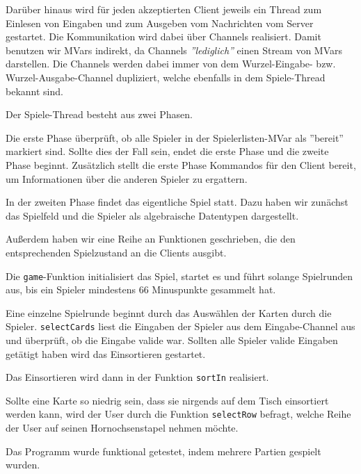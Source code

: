 \documentclass{rp}
\begin{document}
Darüber hinaus wird für jeden akzeptierten Client jeweils ein Thread zum Einlesen von Eingaben und zum Ausgeben vom Nachrichten vom Server gestartet. Die Kommunikation wird dabei über Channels realisiert. Damit benutzen wir MVars indirekt, da Channels \textit{''lediglich''} einen Stream von MVars darstellen. Die Channels werden dabei immer von dem Wurzel-Eingabe- bzw. Wurzel-Ausgabe-Channel dupliziert, welche ebenfalls in dem Spiele-Thread bekannt sind. 

Der Spiele-Thread besteht aus zwei Phasen.

Die erste Phase überprüft, ob alle Spieler in der Spielerlisten-MVar als ''bereit'' markiert sind. Sollte dies der Fall sein, endet die erste Phase und die zweite Phase beginnt. Zusätzlich stellt die erste Phase Kommandos für den Client bereit, um Informationen über die anderen Spieler zu ergattern. 

In der zweiten Phase findet das eigentliche Spiel statt. Dazu haben wir zunächst das Spielfeld und die Spieler als algebraische Datentypen dargestellt. 

Außerdem haben wir eine Reihe an Funktionen geschrieben, die den entsprechenden Spielzustand an die Clients ausgibt. 

Die \texttt{game}-Funktion initialisiert das Spiel, startet es und führt solange Spielrunden aus, bis ein Spieler mindestens 66 Minuspunkte gesammelt hat. 

Eine einzelne Spielrunde beginnt durch das Auswählen der Karten durch die Spieler. \texttt{selectCards} liest die Eingaben der Spieler aus dem Eingabe-Channel aus und überprüft, ob die Eingabe valide war. Sollten alle Spieler valide Eingaben getätigt haben wird das Einsortieren gestartet. 

Das Einsortieren wird dann in der Funktion \texttt{sortIn} realisiert. 

Sollte eine Karte so niedrig sein, dass sie nirgends auf dem Tisch einsortiert werden kann, wird der User durch die Funktion \texttt{selectRow} befragt, welche Reihe der User auf seinen Hornochsenstapel nehmen möchte. 

Das Programm wurde funktional getestet, indem mehrere Partien gespielt wurden. 
\end{document}
